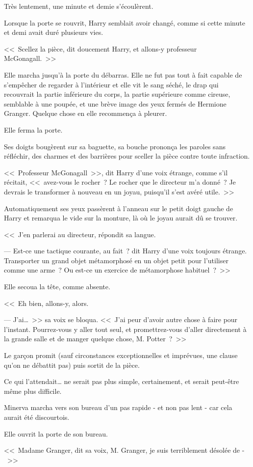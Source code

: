 Très lentement, une minute et demie s'écoulèrent.

\later

Lorsque la porte se rouvrit, Harry semblait avoir changé, comme si cette minute et demi avait duré plusieurs vies.

<<~Scellez la pièce, dit doucement Harry, et allons-y professeur McGonagall.~>>

Elle marcha jusqu'à la porte du débarras. Elle ne fut pas tout à fait capable de s'empêcher de regarder à l'intérieur et elle vit le sang séché, le drap qui recouvrait la partie inférieure du corps, la partie supérieure comme cireuse, semblable à une poupée, et une brève image des yeux fermés de Hermione Granger. Quelque chose en elle recommença à pleurer.

Elle ferma la porte.

Ses doigts bougèrent sur sa baguette, sa bouche prononça les paroles sans réfléchir, des charmes et des barrières pour sceller la pièce contre toute infraction.

<<~Professeur McGonagall~>>, dit Harry d'une voix étrange, comme s'il récitait, <<~avez-vous le rocher~? Le rocher que le directeur m'a donné~? Je devrais le transformer à nouveau en un joyau, puisqu'il s'est avéré utile.~>>

Automatiquement ses yeux passèrent à l'anneau sur le petit doigt gauche de Harry et remarqua le vide sur la monture, là où le joyau aurait dû se trouver.

<<~J'en parlerai au directeur, répondit sa langue.

--- Est-ce une tactique courante, au fait~? dit Harry d'une voix toujours étrange. Transporter un grand objet métamorphosé en un objet petit pour l'utiliser comme une arme~? Ou est-ce un exercice de métamorphose habituel~?~>>

Elle secoua la tête, comme absente.

<<~Eh bien, allons-y, alors.

--- J'ai…~>> sa voix se bloqua. <<~J'ai peur d'avoir autre chose à faire pour l'instant. Pourrez-vous y aller tout seul, et promettrez-vous d'aller directement à la grande salle et de manger quelque chose, M. Potter~?~>>

Le garçon promit (sauf circonstances exceptionnelles et imprévues, une clause qu'on ne débattit pas) puis sortit de la pièce.

Ce qui l'attendait… ne serait pas plus simple, certainement, et serait peut-être même plus difficile.

\later

Minerva marcha vers son bureau d'un pas rapide - et non pas lent - car cela aurait été discourtois.

Elle ouvrit la porte de son bureau.

<<~Madame Granger, dit sa voix, M. Granger, je suis terriblement désolée de -~>>
